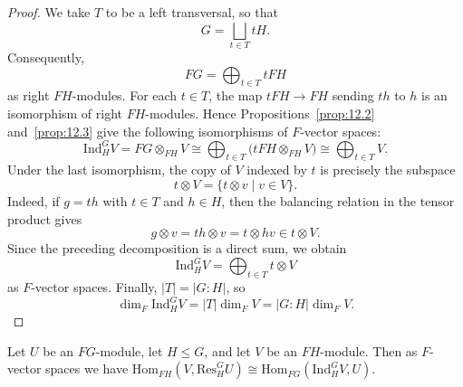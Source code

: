 \documentclass[../Odyssey_Project.tex]{subfiles}
\begin{document}
\begin{proof}
    We take $T$ to be a left transversal, so that
    \[
        G=\bigsqcup_{t\in T}tH.
    \]
    Consequently,
    \[
        FG=\bigoplus_{t\in T}tFH
    \]
    as right $FH$-modules. For each $t\in T$, the map $tFH\to FH$ sending $th$ to $h$ is an isomorphism of right $FH$-modules. Hence Propositions~\ref{prop:12.2} and~\ref{prop:12.3} give the following isomorphisms of $F$-vector spaces:
    \[
        \mathrm{Ind}_H^G V
        =
        FG\otimes_{FH}V
        \cong
        \bigoplus_{t\in T}\bigl(tFH\otimes_{FH}V\bigr)
        \cong
        \bigoplus_{t\in T}V.
    \]
    Under the last isomorphism, the copy of $V$ indexed by $t$ is precisely the subspace
    \[
        t\otimes V=\{t\otimes v\mid v\in V\}.
    \]
    Indeed, if $g=th$ with $t\in T$ and $h\in H$, then the balancing relation in the tensor product gives
    \[
        g\otimes v=th\otimes v=t\otimes hv\in t\otimes V.
    \]
    Since the preceding decomposition is a direct sum, we obtain
    \[
        \mathrm{Ind}_H^G V=\bigoplus_{t\in T}t\otimes V
    \]
    as $F$-vector spaces. Finally, $|T|=|G : H|$, so
    \[
        \dim_F\mathrm{Ind}_H^G V
        =
        |T|\dim_FV
        =
        |G : H|\dim_FV.
    \]
\end{proof}

\begin{namedtheorem}
\label{thm:frobenius-reciprocity}
Let $U$ be an $FG$-module, let $H \leq G$, and let $V$ be an $FH$-module. Then as $F$-vector spaces we have $\mathrm{Hom}_{FH}(V, \mathrm{Res}_H^G U) \cong \mathrm{Hom}_{FG}(\mathrm{Ind}_H^G V, U)$.
\end{namedtheorem}
\end{document}
